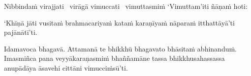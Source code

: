 \begin{pali-hang}
Nibbindaṁ virajjati \breathmark\ virāgā vimuccati \breathmark\ vimuttasmiṁ `Vimuttam'iti ñāṇaṁ hoti:
\end{pali-hang}

\begin{pali-hang}
`Khīṇā jāti vusitaṁ brahmacariyaṁ kataṁ karaṇīyaṁ nāparaṁ itthattāyā'ti pajānātī'ti.
\end{pali-hang}

\begin{pali-hang}
Idamavoca bhagavā. Attamanā te bhikkhū bhagavato bhāsitaṁ abhinanduṁ. Imasmiñca pana veyyākaraṇasmiṁ bhaññamāne tassa bhikkhusahassassa anupādāya āsavehi cittāni vimucciṁsū'ti.
\end{pali-hang}

\suttaRef{[SN 35.28]}

